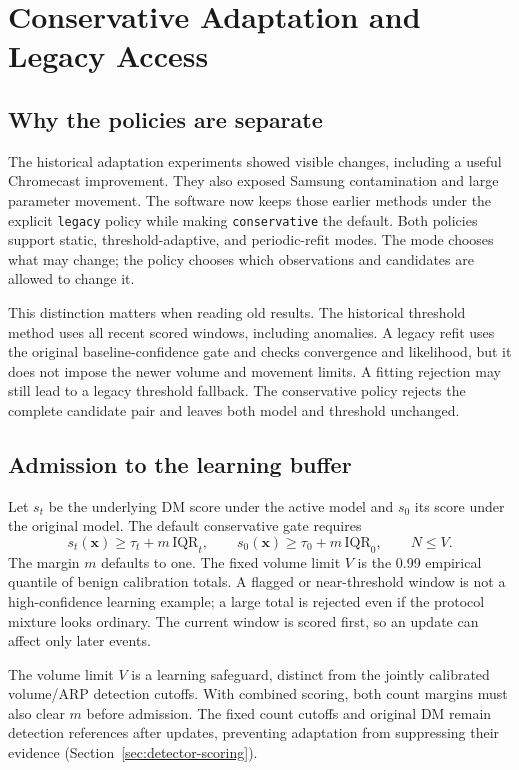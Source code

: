 \section{Conservative Adaptation and Legacy Access}
\label{sec:conservative}

\subsection{Why the policies are separate}

The historical adaptation experiments showed visible changes, including a useful
Chromecast improvement. They also exposed Samsung contamination and large
parameter movement. The software now keeps those earlier methods under the
explicit \texttt{legacy} policy while making \texttt{conservative} the default.
Both policies support static, threshold-adaptive, and periodic-refit modes.
The mode chooses what may change; the policy chooses which observations and
candidates are allowed to change it.

This distinction matters when reading old results. The historical threshold
method uses all recent scored windows, including anomalies. A legacy refit uses
the original baseline-confidence gate and checks convergence and likelihood,
but it does not impose the newer volume and movement limits. A fitting
rejection may still lead to a legacy threshold fallback. The conservative
policy rejects the complete candidate pair and leaves both model and threshold
unchanged.

\subsection{Admission to the learning buffer}

Let $s_t$ be the underlying DM score under the active model and $s_0$ its score
under the original model. The default conservative gate requires
\[
s_t(\mathbf{x})\geq\tau_t+m\,\mathrm{IQR}_t,\qquad
s_0(\mathbf{x})\geq\tau_0+m\,\mathrm{IQR}_0,\qquad N\leq V.
\]
The margin $m$ defaults to one. The fixed volume limit $V$ is the 0.99 empirical
quantile of benign calibration totals. A flagged or near-threshold window is
not a high-confidence learning example; a large total is rejected even if the
protocol mixture looks ordinary. The current window is scored first, so an
update can affect only later events.

The volume limit $V$ is a learning safeguard, distinct from the jointly
calibrated volume/ARP detection cutoffs. With combined scoring, both count
margins must also clear $m$ before admission. The fixed count cutoffs and
original DM remain detection references after updates, preventing adaptation
from suppressing their evidence (Section~\ref{sec:detector-scoring}).

